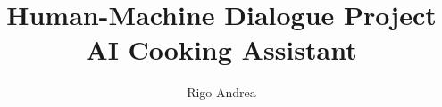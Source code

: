 \documentclass[journal, 11pt]{IEEEtran}
\begin{document}
%
\title{Human-Machine Dialogue Project\\AI Cooking Assistant}
%
%
%

\author{Rigo Andrea}


% 
%



%
{}
% 
\end{document}
